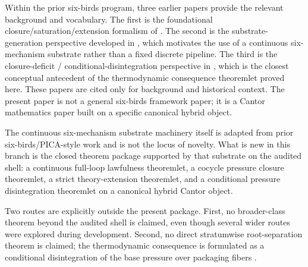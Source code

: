 Within the prior six-birds program, three earlier papers provide the relevant background and vocabulary. The first is the foundational closure/saturation/extension formalism of \cite{TsiokosFoundations}. The second is the substrate-generation perspective developed in \cite{TsiokosCreateStone}, which motivates the use of a continuous six-mechanism substrate rather than a fixed discrete pipeline. The third is the closure-deficit / conditional-disintegration perspective in \cite{TsiokosCastStone}, which is the closest conceptual antecedent of the thermodynamic consequence theoremlet proved here. These papers are cited only for background and historical context. The present paper is not a general six-birds framework paper; it is a Cantor mathematics paper built on a specific canonical hybrid object.

The continuous six-mechanism substrate machinery itself is adapted from prior six-birds/PICA-style work and is not the locus of novelty. What is new in this branch is the closed theorem package supported by that substrate on the audited shell: a continuous full-loop lawfulness theoremlet, a cocycle pressure closure theoremlet, a strict theory-extension theoremlet, and a conditional pressure disintegration theoremlet on a canonical hybrid Cantor object.

Two routes are explicitly outside the present package. First, no broader-class theorem beyond the audited shell is claimed, even though several wider routes were explored during development. Second, no direct stratumwise root-separation theorem is claimed; the thermodynamic consequence is formulated as a conditional disintegration of the base pressure over packaging fibers \cite{Rokhlin1949FundamentalIdeas,LedrappierWalters1977RelativisedVP,CoverThomas2006InfoTheory}.
